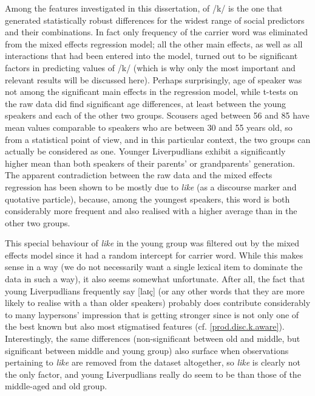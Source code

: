 Among the features investigated in this dissertation,  of /k/ is the one that generated statistically robust differences for the widest range of social predictors and their combinations.
In fact only frequency of the carrier word was eliminated from the mixed effects regression model; all the other main effects, as well as all interactions that had been entered into the model, turned out to be significant factors in predicting  values of /k/ (which is why only the most important and relevant results will be discussed here).
Perhaps surprisingly, age of speaker was not among the significant main effects in the regression model, while t-tests on the raw data did find significant age differences, at least between the young speakers and each of the other two groups.
Scousers aged between 56 and 85 have mean  values comparable to speakers who are between 30 and 55 years old, so from a statistical point of view, and in this particular context, the two groups can actually be considered as one.
Younger Liverpudlians exhibit a significantly higher mean  than both speakers of their parents' or grandparents' generation.
The apparent contradiction between the raw data and the mixed effects regression has been shown to be mostly due to \emph{like} (as a discourse marker and quotative particle), because, among the youngest speakers, this word is both considerably more frequent and also realised with a higher average  than in the other two groups. 

This special behaviour of \emph{like} in the young group was filtered out by the mixed effects model since it had a random intercept for carrier word.
While this makes sense in a way (we do not necessarily want a single lexical item to dominate the data in such a way), it also seems somewhat unfortunate.
After all, the fact that young Liverpudlians frequently say [laɪç] (or any other words that they are more likely to realise with a  than older speakers) probably does contribute considerably to many laypersons' impression that  is getting stronger since  is not only one of the best known but also most stigmatised features (cf. \ref{prod.disc.k.aware}).
Interestingly, the same differences (non-significant between old and middle, but significant between middle and young group) also surface when observations pertaining to \emph{like} are removed from the dataset altogether, so \emph{like} is clearly not the only factor, and young Liverpudlians really do seem to be  than those of the middle-aged and old group.

